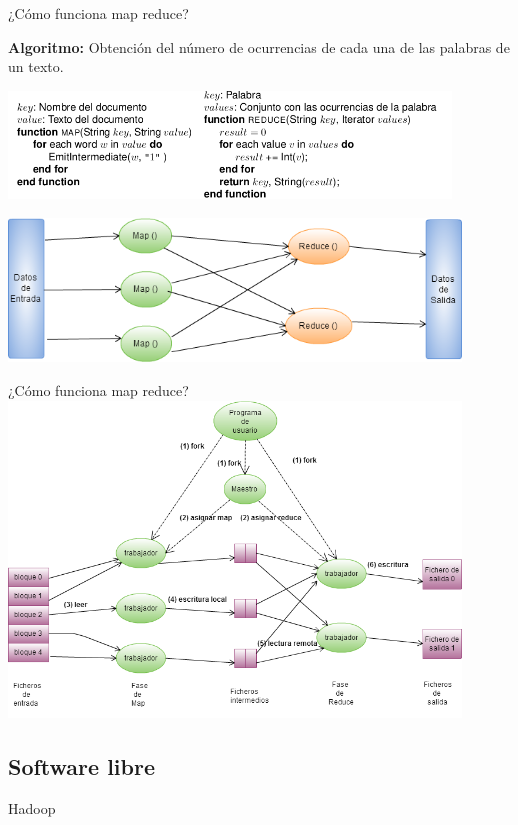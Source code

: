 		\begin{frame}{¿Cómo funciona map reduce?}
			
			\fontsize{7}{8}\selectfont	
			\centering
			
			\noindent\makebox[\linewidth]{\rule{\textwidth}{0.4pt}}			
			\textbf{Algoritmo:} Obtención del número de ocurrencias de cada una de las palabras de un texto.
			\noindent\makebox[\linewidth]{\rule{\textwidth}{0.4pt}}

			\kern2mm					
			\includegraphics[width=0.88\textwidth]{./Images/count-words.png}		


			\noindent\makebox[\linewidth]{\rule{\textwidth}{0.4pt}}

			\kern2mm					
			\includegraphics[width=0.9\textwidth]{./Images/MapReduce.png}
		\end{frame}


		\begin{frame}{¿Cómo funciona map reduce?}
			\includegraphics[width=0.9\textwidth]{./Images/MapReduce-MasterWorkers.png}
		\end{frame}

	\subsection*{Software libre}
	
		\begin{frame}{Hadoop}
			
			
		\end{frame}
